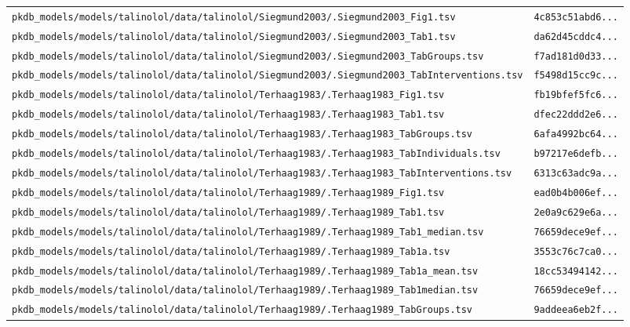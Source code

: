 \documentclass{article}
\begin{document}
\begin{longtable}{ll}
\texttt{pkdb\_models/models/talinolol/data/talinolol/Siegmund2003/.Siegmund2003\_Fig1.tsv} & \texttt{4c853c51abd6...} \\
\texttt{pkdb\_models/models/talinolol/data/talinolol/Siegmund2003/.Siegmund2003\_Tab1.tsv} & \texttt{da62d45cddc4...} \\
\texttt{pkdb\_models/models/talinolol/data/talinolol/Siegmund2003/.Siegmund2003\_TabGroups.tsv} & \texttt{f7ad181d0d33...} \\
\texttt{pkdb\_models/models/talinolol/data/talinolol/Siegmund2003/.Siegmund2003\_TabInterventions.tsv} & \texttt{f5498d15cc9c...} \\
\texttt{pkdb\_models/models/talinolol/data/talinolol/Terhaag1983/.Terhaag1983\_Fig1.tsv} & \texttt{fb19bfef5fc6...} \\
\texttt{pkdb\_models/models/talinolol/data/talinolol/Terhaag1983/.Terhaag1983\_Tab1.tsv} & \texttt{dfec22ddd2e6...} \\
\texttt{pkdb\_models/models/talinolol/data/talinolol/Terhaag1983/.Terhaag1983\_TabGroups.tsv} & \texttt{6afa4992bc64...} \\
\texttt{pkdb\_models/models/talinolol/data/talinolol/Terhaag1983/.Terhaag1983\_TabIndividuals.tsv} & \texttt{b97217e6defb...} \\
\texttt{pkdb\_models/models/talinolol/data/talinolol/Terhaag1983/.Terhaag1983\_TabInterventions.tsv} & \texttt{6313c63adc9a...} \\
\texttt{pkdb\_models/models/talinolol/data/talinolol/Terhaag1989/.Terhaag1989\_Fig1.tsv} & \texttt{ead0b4b006ef...} \\
\texttt{pkdb\_models/models/talinolol/data/talinolol/Terhaag1989/.Terhaag1989\_Tab1.tsv} & \texttt{2e0a9c629e6a...} \\
\texttt{pkdb\_models/models/talinolol/data/talinolol/Terhaag1989/.Terhaag1989\_Tab1\_median.tsv} & \texttt{76659dece9ef...} \\
\texttt{pkdb\_models/models/talinolol/data/talinolol/Terhaag1989/.Terhaag1989\_Tab1a.tsv} & \texttt{3553c76c7ca0...} \\
\texttt{pkdb\_models/models/talinolol/data/talinolol/Terhaag1989/.Terhaag1989\_Tab1a\_mean.tsv} & \texttt{18cc53494142...} \\
\texttt{pkdb\_models/models/talinolol/data/talinolol/Terhaag1989/.Terhaag1989\_Tab1median.tsv} & \texttt{76659dece9ef...} \\
\texttt{pkdb\_models/models/talinolol/data/talinolol/Terhaag1989/.Terhaag1989\_TabGroups.tsv} & \texttt{9addeea6eb2f...} \\

\end{longtable}
\end{document}
